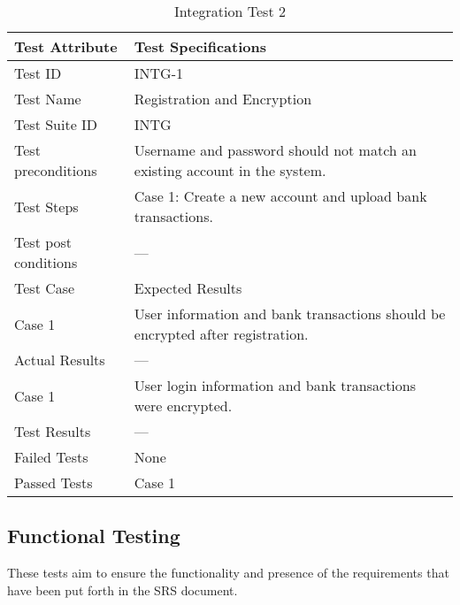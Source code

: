 \documentclass{article}
\begin{document}
\begin{table}[htbp]
\begin{center}
\begin{tabular}{|l | l|}
\hline
Test Attribute & Test Specifications \\
\hline
Test ID & INTG-1 \\
\hline
Test Name  & Registration and Encryption \\
\hline
Test Suite  ID & INTG \\
\hline
Test preconditions & Username and password should not match an existing account in the system. \\
\hline
Test Steps & Case 1: Create a new account and upload bank transactions. \\

\hline
Test post conditions & --- \\
\hline
Test Case & Expected Results\\
\hline
Case 1  &  User information and bank transactions should be encrypted after registration. \\

\hline
Actual Results & ---\\
\hline
Case 1  & User login information and bank transactions were encrypted.  \\
\hline
Test Results & ---\\
\hline
Failed Tests & None\\
\hline
Passed Tests & Case 1 \\
\hline
\end{tabular}
\end{center}
\caption{Integration Test 2}
\end{table}
\label{table:2a -intg2}

\clearpage

\subsection{Functional Testing}

These tests aim to ensure the functionality and presence of the requirements that have been put forth in the SRS document.
\end{document}
